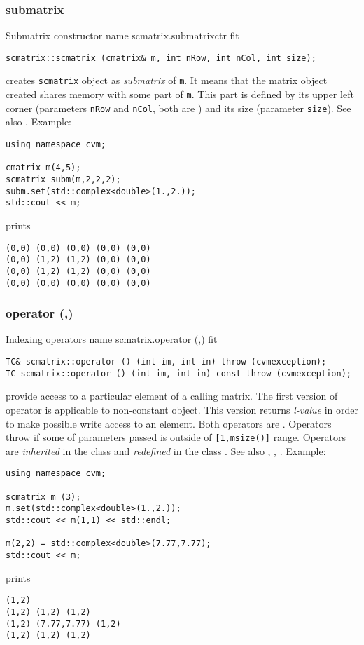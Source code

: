 \subsubsection{submatrix}
Submatrix constructor%
\pdfdest name {scmatrix.submatrixctr} fit
\begin{verbatim}
scmatrix::scmatrix (cmatrix& m, int nRow, int nCol, int size);
\end{verbatim}
creates  \verb"scmatrix" object as  \emph{submatrix} of \verb"m".
It means that the matrix object created shares  memory with some part
of \verb"m". This part is defined by its upper left corner (parameters 
\verb"nRow" and \verb"nCol", both are \Based)
and its size (parameter \verb"size").
See also .
Example:
\begin{Verbatim}
using namespace cvm;

cmatrix m(4,5);
scmatrix subm(m,2,2,2);
subm.set(std::complex<double>(1.,2.));
std::cout << m;
\end{Verbatim}
prints
\begin{Verbatim}
(0,0) (0,0) (0,0) (0,0) (0,0)
(0,0) (1,2) (1,2) (0,0) (0,0)
(0,0) (1,2) (1,2) (0,0) (0,0)
(0,0) (0,0) (0,0) (0,0) (0,0)
\end{Verbatim}
\newpage




\subsubsection{operator (,)}
Indexing operators%
\pdfdest name {scmatrix.operator (,)} fit
\begin{verbatim}
TC& scmatrix::operator () (int im, int in) throw (cvmexception);
TC scmatrix::operator () (int im, int in) const throw (cvmexception);
\end{verbatim}
provide access to a particular element of a calling matrix. The first version
of  operator is applicable to  non-constant object.
This version returns \emph{l-value}
in order to make possible write access to an element.
Both operators are \Based.
Operators throw 
if some of parameters passed
is outside of \verb"[1,msize()]" range.
Operators are \emph{inherited}
in the class
and \emph{redefined}
in the class .
See also ,
,
.
Example:
\begin{Verbatim}
using namespace cvm;

scmatrix m (3);
m.set(std::complex<double>(1.,2.));
std::cout << m(1,1) << std::endl;

m(2,2) = std::complex<double>(7.77,7.77);
std::cout << m;
\end{Verbatim}
prints
\begin{Verbatim}
(1,2)
(1,2) (1,2) (1,2)
(1,2) (7.77,7.77) (1,2)
(1,2) (1,2) (1,2)
\end{Verbatim}
\newpage




